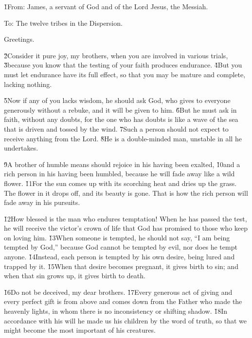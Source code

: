 


\v{1}From: James, a servant of God and of the Lord Jesus, the Messiah.

To: The twelve tribes in the Dispersion.

Greetings.

\v{2}Consider it pure joy, my brothers, when you are involved in various trials, \v{3}because you know that the testing of your faith produces endurance. \v{4}But you must let endurance have its full effect, so that you may be mature and complete, lacking nothing.

\v{5}Now if any of you lacks wisdom, he should ask God, who gives to everyone generously without a rebuke, and it will be given to him. \v{6}But he must ask in faith, without any doubts, for the one who has doubts is like a wave of the sea that is driven and tossed by the wind. \v{7}Such a person should not expect to receive anything from the Lord. \v{8}He is a double-minded man, unstable in all he undertakes.

\v{9}A brother of humble means should rejoice in his having been exalted, \v{10}and a rich person in his having been humbled, because he will fade away like a wild flower. \v{11}For the sun comes up with its scorching heat and dries up the grass. The flower in it drops off, and its beauty is gone. That is how the rich person will fade away in his pursuits.

\v{12}How blessed is the man who endures temptation! When he has passed the test, he will receive the victor's crown of life that God has promised to those who keep on loving him. \v{13}When someone is tempted, he should not say, ``I am being tempted by God,'' because God cannot be tempted by evil, nor does he tempt anyone. \v{14}Instead, each person is tempted by his own desire, being lured and trapped by it. \v{15}When that desire becomes pregnant, it gives birth to sin; and when that sin grows up, it gives birth to death.

\v{16}Do not be deceived, my dear brothers. \v{17}Every generous act of giving and every perfect gift is from above and comes down from the Father who made the heavenly lights, in whom there is no inconsistency or shifting shadow. \v{18}In accordance with his will he made us his children by the word of truth, so that we might become the most important of his creatures.

